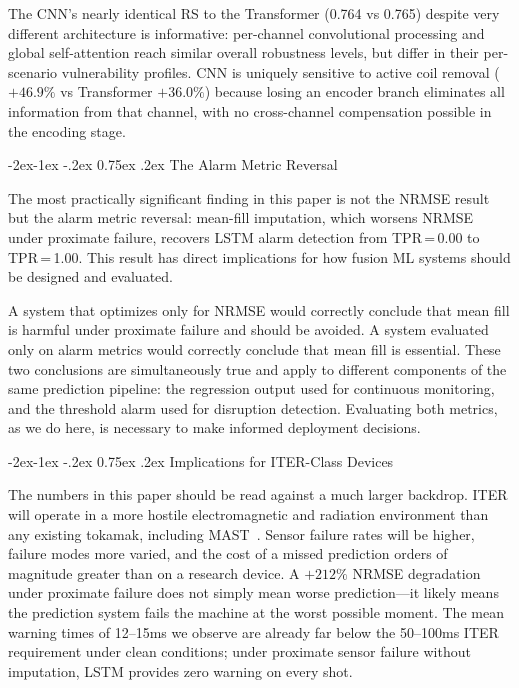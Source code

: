 \documentclass[10pt,twocolumn]{article}
\makeatletter
\renewcommand\subsection{\@startsection{subsection}{2}{\z@}%
  {-2ex\@plus -1ex \@minus -.2ex}%
  {0.75ex \@plus .2ex}%
  {\normalfont\large\bfseries}}
\makeatother
\begin{document}
The CNN's nearly identical RS to the Transformer (0.764 vs 0.765)
despite very different architecture is informative: per-channel
convolutional processing and global self-attention reach similar overall
robustness levels, but differ in their per-scenario vulnerability
profiles. CNN is uniquely sensitive to active coil removal ($+46.9\%$
vs Transformer $+36.0\%$) because losing an encoder branch eliminates
all information from that channel, with no cross-channel compensation
possible in the encoding stage.

\subsection{The Alarm Metric Reversal}

The most practically significant finding in this paper is not the
NRMSE result but the alarm metric reversal: mean-fill imputation, which
worsens NRMSE under proximate failure, recovers LSTM alarm detection
from TPR\,=\,0.00 to TPR\,=\,1.00. This result has direct implications
for how fusion ML systems should be designed and evaluated.

A system that optimizes only for NRMSE would correctly conclude that
mean fill is harmful under proximate failure and should be avoided.
A system evaluated only on alarm metrics would correctly conclude that
mean fill is essential. These two conclusions are simultaneously true
and apply to different components of the same prediction pipeline:
the regression output used for continuous monitoring, and the threshold
alarm used for disruption detection. Evaluating both metrics, as we
do here, is necessary to make informed deployment decisions.

\subsection{Implications for ITER-Class Devices}

The numbers in this paper should be read against a much larger backdrop.
ITER will operate in a more hostile electromagnetic and radiation
environment than any existing tokamak, including MAST~\cite{iter1999}.
Sensor failure rates will be higher, failure modes more varied, and
the cost of a missed prediction orders of magnitude greater than on a
research device. A $+212\%$ NRMSE degradation under proximate failure
does not simply mean worse prediction—it likely means the prediction
system fails the machine at the worst possible moment. The mean warning
times of 12--15ms we observe are already far below the 50--100ms ITER
requirement under clean conditions; under proximate sensor failure
without imputation, LSTM provides zero warning on every shot.
\end{document}
